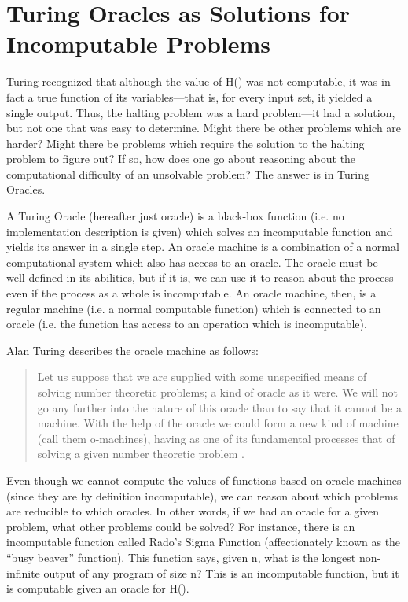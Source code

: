 \section[Turing Oracles as Solutions]{Turing Oracles as Solutions for Incomputable Problems}

Turing recognized that although the value of H() was not computable, it was in fact a true function of its variables---that is, for every input set, it yielded a single output.  Thus, the halting problem was a hard problem---it had a solution, but not one that was easy to determine.  Might there be other problems which are harder?  Might there be problems which require the solution to the halting problem to figure out?  If so, how does one go about reasoning about the computational difficulty of an unsolvable problem?  The answer is in Turing Oracles.

A Turing Oracle (hereafter just oracle) is a black-box function (i.e. no implementation description is given) which solves an incomputable function and yields its answer in a single step.  An oracle machine is a combination of a normal computational system which also has access to an oracle.  The oracle must be well-defined in its abilities, but if it is, we can use it to reason about the process even if the process as a whole is incomputable.  An oracle machine, then, is a regular machine (i.e. a normal computable function) which is connected to an oracle (i.e. the function has access to an operation which is incomputable).

Alan Turing describes the oracle machine as follows:

\begin{quote}
Let us suppose that we are supplied with some unspecified means of solving number theoretic problems; a kind of oracle as it were.  We will not go any further into the nature of this oracle than to say that it cannot be a machine.  With the help of the oracle we could form a new kind of machine (call them o-machines), having as one of its fundamental processes that of solving a given number theoretic problem \citep{turing1939}.
\end{quote}

Even though we cannot compute the values of functions based on oracle machines (since they are by definition incomputable), we can reason about which problems are reducible to which oracles.  In other words, if we had an oracle for a given problem, what other problems could be solved?  For instance, there is an incomputable function called Rado's Sigma Function (affectionately known as the ``busy beaver'' function).  This function says, given n, what is the longest non-infinite output of any program of size n?  This is an incomputable function, but it is computable given an oracle for H().

